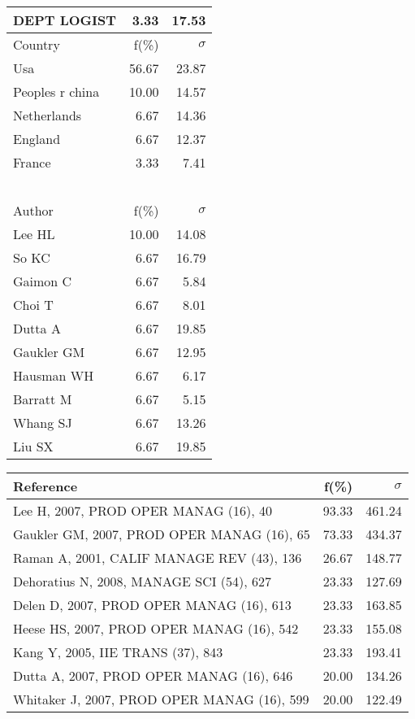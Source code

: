 \documentclass[a4paper,11pt]{report}
\begin{document}
\begin{landscape}
\begin{table}[!ht]
{\begin{tabular}{|l r r|}
DEPT LOGIST & 3.33 & 17.53\\
\hline
\hline
Country & f(\%) & $\sigma$\\
\hline
Usa & 56.67 & 23.87\\
Peoples r china & 10.00 & 14.57\\
Netherlands & 6.67 & 14.36\\
England & 6.67 & 12.37\\
France & 3.33 & 7.41\\
 &  & \\
 &  & \\
 &  & \\
 &  & \\
 &  & \\
\hline
\hline
Author & f(\%) & $\sigma$\\
\hline
Lee HL & 10.00 & 14.08\\
So KC & 6.67 & 16.79\\
Gaimon C & 6.67 & 5.84\\
Choi T & 6.67 & 8.01\\
Dutta A & 6.67 & 19.85\\
Gaukler GM & 6.67 & 12.95\\
Hausman WH & 6.67 & 6.17\\
Barratt M & 6.67 & 5.15\\
Whang SJ & 6.67 & 13.26\\
Liu SX & 6.67 & 19.85\\
\hline
\end{tabular}
}
{\scriptsize\begin{tabular}{|l r r|}
\hline
Reference & f(\%) & $\sigma$\\
\hline
Lee H, 2007, PROD OPER MANAG (16), 40 & 93.33 & 461.24\\
Gaukler GM, 2007, PROD OPER MANAG (16), 65 & 73.33 & 434.37\\
Raman A, 2001, CALIF MANAGE REV (43), 136 & 26.67 & 148.77\\
Dehoratius N, 2008, MANAGE SCI (54), 627 & 23.33 & 127.69\\
Delen D, 2007, PROD OPER MANAG (16), 613 & 23.33 & 163.85\\
Heese HS, 2007, PROD OPER MANAG (16), 542 & 23.33 & 155.08\\
Kang Y, 2005, IIE TRANS (37), 843 & 23.33 & 193.41\\
Dutta A, 2007, PROD OPER MANAG (16), 646 & 20.00 & 134.26\\
Whitaker J, 2007, PROD OPER MANAG (16), 599 & 20.00 & 122.49\\

\end{tabular}}
\end{table}
\end{landscape}
\end{document}
